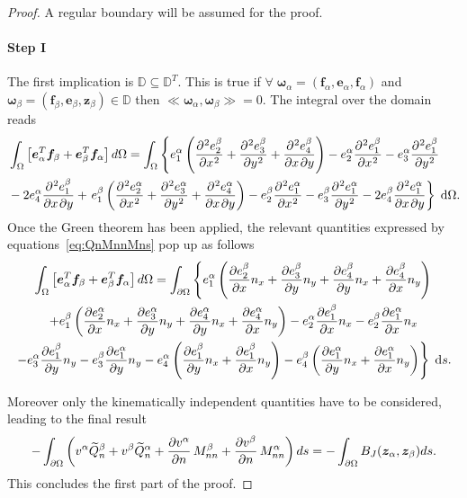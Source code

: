 \documentclass[preprint,12pt]{elsarticle}
\begin{document}
	\begin{proof}
		A regular boundary will be assumed for the proof.
		\paragraph{\textbf{Step I}} 
		The first implication is $\mathbb{D} \subseteq \mathbb{D}^T$. This is true if $ \forall \;\bm\omega_\alpha = (\bm{f}_\alpha, \bm{e}_\alpha, \bm{f}_\alpha)$ and $\bm\omega_\beta = (\bm{f}_\beta, \bm{e}_\beta, \bm{z}_\beta) \in \mathbb{D}$ then $\ll \bm\omega_\alpha, \bm\omega_\beta \gg = 0$. The integral over the domain reads
		\begin{align*}
		&\int_{\Omega}  \left[ \bm{e}_\alpha^T \bm{f}_\beta + \bm{e}_\beta^T \bm{f}_\alpha \right] d\Omega
		= \int_{\Omega} \left\{ e_1^\alpha \left( \diffp[2]{e_2^\beta}{x} + \diffp[2]{e_3^\beta}{y} + \diffp{e_4^\beta}{x,y} \right) - e_2^\alpha \diffp[2]{e_1^\beta}{x} -e_3^\alpha \diffp[2]{e_1^\beta}{y} \right.\\ 
		&  - 2 e_4^\alpha \diffp{e_1^\beta}{x,y} + 
		\left. e_1^\beta \left( \diffp[2]{e_2^\alpha}{x} + \diffp[2]{e_3^\alpha}{y} + \diffp{e_4^\alpha}{x,y} \right) - e_2^\beta \diffp[2]{e_1^\alpha}{x} -e_3^\beta \diffp[2]{e_1^\alpha}{y} - 2 e_4^\beta \diffp{e_1^\alpha}{x,y} \right\} \d{\Omega}. \\
		\end{align*}
		Once the Green theorem has been applied,  the relevant quantities expressed by equations~\eqref{eq:QnMnnMns} pop up as follows
		\begin{multline}
		\int_{\Omega}  \left[ \bm{e}_\alpha^T \bm{f}_\beta + \bm{e}_\beta^T \bm{f}_\alpha \right] d\Omega = \int_{\partial \Omega}  \left\{ e_1^\alpha \left( \diffp{e_2^\beta}{x} n_x + \diffp{e_3^\beta}{y} n_y +\diffp{e_4^\beta}{y} n_x + \diffp{e_4^\beta}{x} n_y \right) \right. \\
		\left.   + e_1^\beta \left( \diffp{e_2^\alpha}{x} n_x + \diffp{e_3^\alpha}{y} n_y +\diffp{e_4^\alpha}{y} n_x + \diffp{e_4^\alpha}{x} n_y \right) - e_2^\alpha \diffp{e_1^\beta}{x} n_x - e_2^\beta \diffp{e_1^\alpha}{x} n_x   \right.\\
		\left. - e_3^\alpha \diffp{e_1^\beta}{y} n_y  - e_3^\beta \diffp{e_1^\alpha}{y} n_y  - e_4^\alpha \left( \diffp{e_1^\beta}{y} n_x + \diffp{e_1^\beta}{x} n_y \right) - e_4^\beta \left( \diffp{e_1^\alpha}{y} n_x + \diffp{e_1^\alpha}{x} n_y \right) \right\} \d{s}. 
		\end{multline}
		
		Moreover only the kinematically independent quantities have to be considered, leading to the final result
		\begin{equation}
		- \int_{\partial \Omega} \left( v^\alpha \widetilde{Q}_n^\beta + v^\beta \widetilde{Q}_n^\alpha + \diffp{v^\alpha}{n} \, M_{nn}^\beta + \diffp{v^\beta}{n} \, M_{nn}^\alpha \right) ds =  - \int_{\partial \Omega}  B_J(\bm{z}_\alpha, \bm{z}_\beta) ds.
		\end{equation}		
		This concludes the first part of the proof.

\end{proof}
\end{document}
